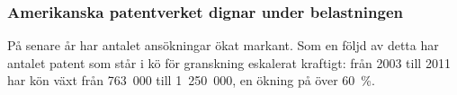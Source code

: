 \subsubsection{Amerikanska patentverket dignar under belastningen}

På senare år har antalet ansökningar ökat markant. Som en följd av detta har antalet patent som står i kö för granskning eskalerat kraftigt: från 2003 till 2011 har kön växt från 763~000 till 1~250~000, en ökning på över 60~\%.


